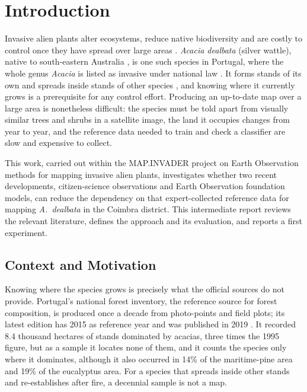 \chapter{Introduction}
\label{sec:introduction}

Invasive alien plants alter ecosystems, reduce native biodiversity and
are costly to control once they have spread over large areas
\cite{ipbes2023}. \emph{Acacia dealbata} (silver wattle), native to
south-eastern Australia \cite{dessi2021}, is one such species in
Portugal, where the whole genus \emph{Acacia} is listed as invasive
under national law \cite{dl92-2019}. It forms stands of its own and
spreads inside stands of other species \cite{icnf2019}, and knowing where it currently grows is a prerequisite for any control
effort. Producing an up-to-date map over a large area is nonetheless
difficult: the species must be told apart from visually similar trees
and shrubs in a satellite image, the land it occupies changes from
year to year, and the reference data needed to train and check a
classifier are slow and expensive to collect.

This work, carried out within the MAP.INVADER project on Earth
Observation methods for mapping invasive alien plants, investigates
whether two recent developments, citizen-science observations and
Earth Observation foundation models, can reduce the dependency on that
expert-collected reference data for mapping \emph{A.~dealbata} in the
Coimbra district. This intermediate report reviews the relevant
literature, defines the approach and its evaluation, and reports a
first experiment.

\section{Context and Motivation}
\label{sec:introduction-motivation}

Knowing where the species grows is precisely what the official
sources do not provide. Portugal's national forest inventory, the
reference source for forest composition, is produced once a decade
from photo-points and field plots; its latest edition has 2015 as
reference year and was published in 2019 \cite{icnf2019}. It recorded
8.4 thousand hectares of stands dominated by acacias, three times the
1995 figure, but as a sample it locates none of them, and it counts
the species only where it dominates, although it also occurred in
14\% of the maritime-pine area and 19\% of the eucalyptus area. For a
species that spreads inside other stands and re-establishes after
fire, a decennial sample is not a map.

